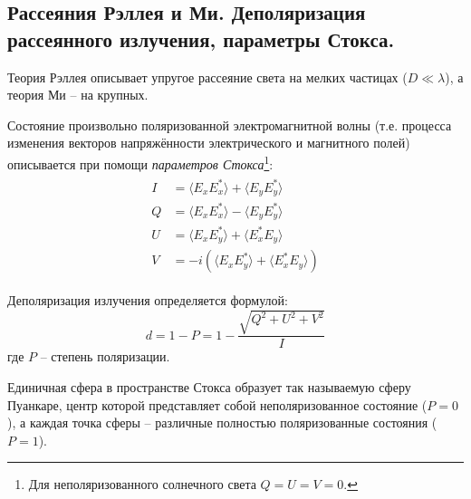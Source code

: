 \subsection{Рассеяния Рэллея и Ми. Деполяризация рассеянного излучения, параметры Стокса.}
Теория Рэллея описывает упругое рассеяние света на мелких частицах ($D\ll\lambda$), а теория Ми -- на крупных.

Состояние произвольно поляризованной электромагнитной волны (т.е. процесса изменения векторов напряжённости электрического и магнитного полей) описывается при помощи \textit{параметров Стокса}\footnote{Для неполяризованного солнечного света $Q=U=V=0$.}:
\begin{align}
\begin{split}
I&=\langle E_xE^*_x\rangle+\langle E_yE^*_y\rangle
\\
Q&=\langle E_xE^*_x\rangle-\langle E_yE^*_y\rangle
\\
U&=\langle E_xE^*_y\rangle+\langle E^*_xE_y\rangle
\\
V&=-i\left(\langle E_xE^*_y\rangle+\langle E^*_xE_y\rangle\right)
\end{split}
\end{align}

Деполяризация излучения определяется формулой:
\begin{equation}
d=1-P=1-\frac{\sqrt{Q^2+U^2+V^2}}{I}
\end{equation}
где $P$ -- степень поляризации.

Единичная сфера в пространстве Стокса образует так называемую сферу Пуанкаре, центр которой представляет собой неполяризованное состояние ($P=0$), а каждая точка сферы -- различные полностью поляризованные состояния ($P=1$).
